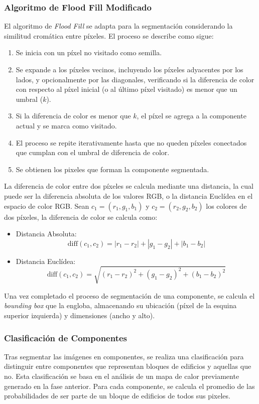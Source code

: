 \documentclass[twocolumn, fontsize=10pt]{article}
\begin{document}
\subsubsection{Algoritmo de Flood Fill Modificado}
El algoritmo de \textit{Flood Fill} se adapta para la segmentación considerando la similitud cromática entre píxeles. El proceso se describe como sigue:

\begin{enumerate}
    \item Se inicia con un píxel no visitado como semilla.
    \item Se expande a los píxeles vecinos, incluyendo los píxeles adyacentes por los lados, y opcionalmente por las diagonales, verificando si la diferencia de color con respecto al píxel inicial (o al último píxel visitado) es menor que un umbral ($\textit{k}$).
    \item Si la diferencia de color es menor que $\textit{k}$, el píxel se agrega a la componente actual y se marca como visitado.
    \item El proceso se repite iterativamente hasta que no queden píxeles conectados que cumplan con el umbral de diferencia de color.
    \item Se obtienen los pixeles que forman la componente segmentada.
\end{enumerate}

La diferencia de color entre dos píxeles se calcula mediante una distancia, la cual puede ser la diferencia absoluta de los valores RGB, o la distancia Euclídea en el espacio de color RGB. Sean $c_1 = (r_1, g_1, b_1)$ y $c_2 = (r_2, g_2, b_2)$ los colores de dos píxeles, la diferencia de color se calcula como:

\begin{itemize}
    \item Distancia Absoluta: 
     \[\text{diff}(c_1, c_2) = |r_1 - r_2| + |g_1 - g_2| + |b_1 - b_2|\] 
    \item Distancia Euclídea:
    \[\text{diff}(c_1, c_2) = \sqrt{(r_1 - r_2)^2 + (g_1 - g_2)^2 + (b_1 - b_2)^2}\]
\end{itemize}

Una vez completado el proceso de segmentación de una componente, se calcula el \textit{bounding box} que la engloba, almacenando su ubicación (píxel de la esquina superior izquierda) y dimensiones (ancho y alto).

\subsubsection{Clasificación de Componentes}
Tras segmentar las imágenes en componentes, se realiza una clasificación para distinguir entre componentes que representan bloques de edificios y aquellas que no. Esta clasificación se basa en el análisis de un mapa de calor previamente generado en la fase anterior. Para cada componente, se calcula el promedio de las probabilidades de ser parte de un bloque de edificios de todos sus pixeles.
\end{document}
